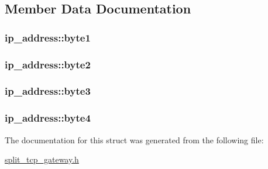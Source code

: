 \subsection{\-Member \-Data \-Documentation}
\hypertarget{structip__address_a9829ac0f8b39812bb17cddc339289799}{
\subsubsection[{byte1}]{ {\bf ip\-\_\-address\-::byte1}}}\label{structip__address_a9829ac0f8b39812bb17cddc339289799}
\hypertarget{structip__address_a15fca759942b133e4ded44dd6893134e}{
\subsubsection[{byte2}]{ {\bf ip\-\_\-address\-::byte2}}}\label{structip__address_a15fca759942b133e4ded44dd6893134e}
\hypertarget{structip__address_ab66ba09a8078bd76b2d94d3c473510c0}{
\subsubsection[{byte3}]{ {\bf ip\-\_\-address\-::byte3}}}\label{structip__address_ab66ba09a8078bd76b2d94d3c473510c0}
\hypertarget{structip__address_af9371530b5b91215d12d5027a3caa1a1}{
\subsubsection[{byte4}]{ {\bf ip\-\_\-address\-::byte4}}}\label{structip__address_af9371530b5b91215d12d5027a3caa1a1}


\-The documentation for this struct was generated from the following file\-:\begin{DoxyCompactItemize}
\item 
\hyperlink{split__tcp__gateway_8h}{split\-\_\-tcp\-\_\-gateway.\-h}\end{DoxyCompactItemize}
